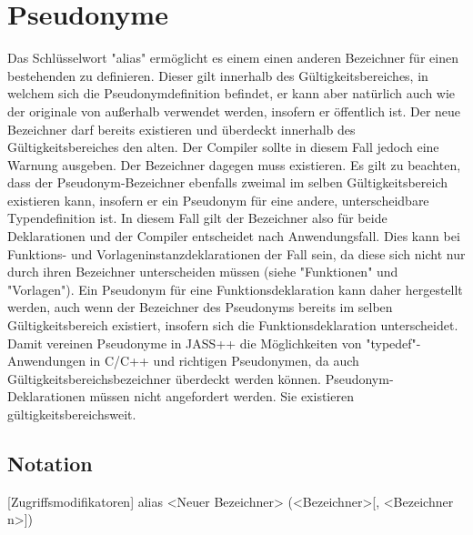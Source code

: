 \chapter{Pseudonyme}
Das Schlüsselwort "alias" ermöglicht es einem einen anderen Bezeichner für einen bestehenden zu definieren. Dieser gilt innerhalb
des Gültigkeitsbereiches, in welchem sich die Pseudonymdefinition befindet, er kann aber natürlich auch wie der originale von außerhalb
verwendet werden, insofern er öffentlich ist.
Der neue Bezeichner darf bereits existieren und überdeckt innerhalb des Gültigkeitsbereiches den alten. Der Compiler sollte in
diesem Fall jedoch eine Warnung ausgeben.
Der Bezeichner dagegen muss existieren.
Es gilt zu beachten, dass der Pseudonym-Bezeichner ebenfalls zweimal im selben Gültigkeitsbereich existieren kann,
insofern er ein Pseudonym für eine andere, unterscheidbare Typendefinition ist.
In diesem Fall gilt der Bezeichner also für beide Deklarationen und der Compiler entscheidet nach Anwendungsfall.
Dies kann bei Funktions- und Vorlageninstanzdeklarationen der Fall sein, da diese sich nicht nur durch ihren Bezeichner
unterscheiden müssen (siehe "Funktionen" und "Vorlagen").
Ein Pseudonym für eine Funktionsdeklaration kann daher hergestellt werden, auch wenn der Bezeichner des Pseudonyms bereits
im selben Gültigkeitsbereich existiert, insofern sich die Funktionsdeklaration unterscheidet.
Damit vereinen Pseudonyme in JASS++ die Möglichkeiten von "typedef"-Anwendungen in C/C++ und richtigen Pseudonymen, da auch
Gültigkeitsbereichsbezeichner überdeckt werden können.
Pseudonym-Deklarationen müssen nicht angefordert werden. Sie existieren gültigkeitsbereichsweit.

\section{Notation}
[Zugriffsmodifikatoren] alias <Neuer Bezeichner> (<Bezeichner>[, <Bezeichner n>])